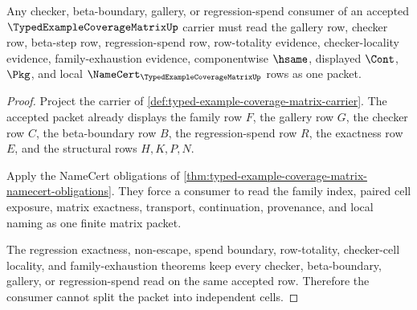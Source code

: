 \begin{theorem}
\label{thm:typed-example-coverage-matrix-component-route}
Any checker, beta-boundary, gallery, or regression-spend consumer of an accepted $\TypedExampleCoverageMatrixUp$ carrier must read the gallery row, checker row, beta-step row, regression-spend row, row-totality evidence, checker-locality evidence, family-exhaustion evidence, componentwise $\hsame$, displayed $\Cont$, $\Pkg$, and local $\NameCert_{\TypedExampleCoverageMatrixUp}$ rows as one packet.
\end{theorem}
\begin{proof}
Project the carrier of \autoref{def:typed-example-coverage-matrix-carrier}. The accepted packet already displays the family row $F$, the gallery row $G$, the checker row $C$, the beta-boundary row $B$, the regression-spend row $R$, the exactness row $E$, and the structural rows $H,K,P,N$.

Apply the NameCert obligations of \autoref{thm:typed-example-coverage-matrix-namecert-obligations}. They force a consumer to read the family index, paired cell exposure, matrix exactness, transport, continuation, provenance, and local naming as one finite matrix packet.

The regression exactness, non-escape, spend boundary, row-totality, checker-cell locality, and family-exhaustion theorems keep every checker, beta-boundary, gallery, or regression-spend read on the same accepted row. Therefore the consumer cannot split the packet into independent cells.
\end{proof}

